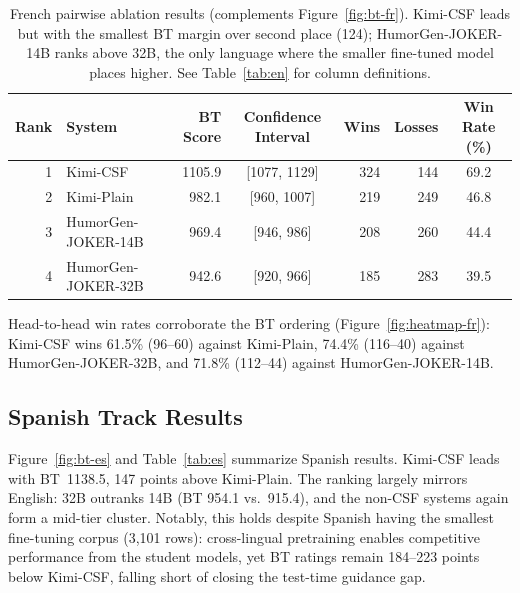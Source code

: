 \documentclass[]{ceurart}
\begin{document}
\begin{table}[h]
  \caption{French pairwise ablation results (complements Figure~\ref{fig:bt-fr}).
    Kimi-CSF leads but with the smallest BT margin over second place (124);
    HumorGen-JOKER-14B ranks above 32B, the only language where the smaller
    fine-tuned model places higher. See Table~\ref{tab:en} for column definitions.}
  \label{tab:fr}
  \small
  \begin{tabular}{rlrcrrc}
    \toprule
    Rank & System & BT Score & Confidence Interval & Wins & Losses & Win Rate (\%) \\
    \midrule
    1 & Kimi-CSF            & 1105.9 & [1077, 1129] & 324 & 144 & 69.2 \\
    2 & Kimi-Plain          &  982.1 & [960, 1007] & 219 & 249 & 46.8 \\
    3 & HumorGen-JOKER-14B  &  969.4 & [946, 986] & 208 & 260 & 44.4 \\
    4 & HumorGen-JOKER-32B  &  942.6 & [920, 966] & 185 & 283 & 39.5 \\
    \bottomrule
  \end{tabular}
\end{table}

Head-to-head win rates corroborate the BT ordering
(Figure~\ref{fig:heatmap-fr}): Kimi-CSF wins 61.5\% (96--60) against
Kimi-Plain, 74.4\% (116--40) against HumorGen-JOKER-32B, and 71.8\%
(112--44) against HumorGen-JOKER-14B.



\subsection{Spanish Track Results}
\label{sec:es}

Figure~\ref{fig:bt-es} and Table~\ref{tab:es} summarize Spanish results.
Kimi-CSF leads with BT~1138.5, 147 points above Kimi-Plain.
The ranking largely mirrors English: 32B outranks 14B (BT 954.1 vs.\ 915.4),
and the non-CSF systems again form a mid-tier cluster.
Notably, this holds despite Spanish having the smallest fine-tuning corpus
(3,101 rows): cross-lingual pretraining enables competitive performance from
the student models, yet BT ratings remain 184--223 points below Kimi-CSF,
falling short of closing the test-time guidance gap.
\end{document}
